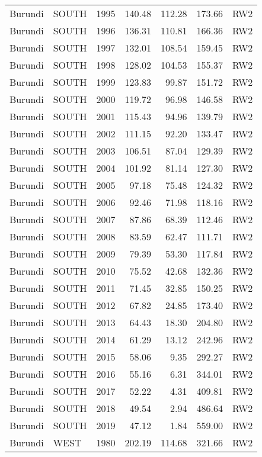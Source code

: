 \begin{longtable}{lllrrrl}
  Burundi & SOUTH & 1995 & 140.48 & 112.28 & 173.66 & RW2 \\ 
  Burundi & SOUTH & 1996 & 136.31 & 110.81 & 166.36 & RW2 \\ 
  Burundi & SOUTH & 1997 & 132.01 & 108.54 & 159.45 & RW2 \\ 
  Burundi & SOUTH & 1998 & 128.02 & 104.53 & 155.37 & RW2 \\ 
  Burundi & SOUTH & 1999 & 123.83 & 99.87 & 151.72 & RW2 \\ 
  Burundi & SOUTH & 2000 & 119.72 & 96.98 & 146.58 & RW2 \\ 
  Burundi & SOUTH & 2001 & 115.43 & 94.96 & 139.79 & RW2 \\ 
  Burundi & SOUTH & 2002 & 111.15 & 92.20 & 133.47 & RW2 \\ 
  Burundi & SOUTH & 2003 & 106.51 & 87.04 & 129.39 & RW2 \\ 
  Burundi & SOUTH & 2004 & 101.92 & 81.14 & 127.30 & RW2 \\ 
  Burundi & SOUTH & 2005 & 97.18 & 75.48 & 124.32 & RW2 \\ 
  Burundi & SOUTH & 2006 & 92.46 & 71.98 & 118.16 & RW2 \\ 
  Burundi & SOUTH & 2007 & 87.86 & 68.39 & 112.46 & RW2 \\ 
  Burundi & SOUTH & 2008 & 83.59 & 62.47 & 111.71 & RW2 \\ 
  Burundi & SOUTH & 2009 & 79.39 & 53.30 & 117.84 & RW2 \\ 
  Burundi & SOUTH & 2010 & 75.52 & 42.68 & 132.36 & RW2 \\ 
  Burundi & SOUTH & 2011 & 71.45 & 32.85 & 150.25 & RW2 \\ 
  Burundi & SOUTH & 2012 & 67.82 & 24.85 & 173.40 & RW2 \\ 
  Burundi & SOUTH & 2013 & 64.43 & 18.30 & 204.80 & RW2 \\ 
  Burundi & SOUTH & 2014 & 61.29 & 13.12 & 242.96 & RW2 \\ 
  Burundi & SOUTH & 2015 & 58.06 & 9.35 & 292.27 & RW2 \\ 
  Burundi & SOUTH & 2016 & 55.16 & 6.31 & 344.01 & RW2 \\ 
  Burundi & SOUTH & 2017 & 52.22 & 4.31 & 409.81 & RW2 \\ 
  Burundi & SOUTH & 2018 & 49.54 & 2.94 & 486.64 & RW2 \\ 
  Burundi & SOUTH & 2019 & 47.12 & 1.84 & 559.00 & RW2 \\ 
  Burundi & WEST & 1980 & 202.19 & 114.68 & 321.66 & RW2 \\ 

\end{longtable}
